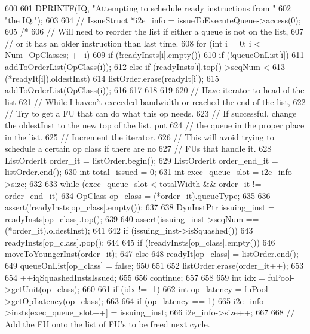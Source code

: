 \begin{DoxyCode}
600 {
601     DPRINTF(IQ, "Attempting to schedule ready instructions from "
602             "the IQ.\n");
603 
604 //    IssueStruct *i2e_info = issueToExecuteQueue->access(0);
605 /*
606     // Will need to reorder the list if either a queue is not on the list,
607     // or it has an older instruction than last time.
608     for (int i = 0; i < Num_OpClasses; ++i) {
609         if (!readyInsts[i].empty()) {
610             if (!queueOnList[i]) {
611                 addToOrderList(OpClass(i));
612             } else if (readyInsts[i].top()->seqNum  <
613                        (*readyIt[i]).oldestInst) {
614                 listOrder.erase(readyIt[i]);
615                 addToOrderList(OpClass(i));
616             }
617         }
618     }
619 
620     // Have iterator to head of the list
621     // While I haven't exceeded bandwidth or reached the end of the list,
622     // Try to get a FU that can do what this op needs.
623     // If successful, change the oldestInst to the new top of the list, put
624     // the queue in the proper place in the list.
625     // Increment the iterator.
626     // This will avoid trying to schedule a certain op class if there are no
627     // FUs that handle it.
628     ListOrderIt order_it = listOrder.begin();
629     ListOrderIt order_end_it = listOrder.end();
630     int total_issued = 0;
631     int exec_queue_slot = i2e_info->size;
632 
633     while (exec_queue_slot < totalWidth && order_it != order_end_it) {
634         OpClass op_class = (*order_it).queueType;
635 
636         assert(!readyInsts[op_class].empty());
637 
638         DynInstPtr issuing_inst = readyInsts[op_class].top();
639 
640         assert(issuing_inst->seqNum == (*order_it).oldestInst);
641 
642         if (issuing_inst->isSquashed()) {
643             readyInsts[op_class].pop();
644 
645             if (!readyInsts[op_class].empty()) {
646                 moveToYoungerInst(order_it);
647             } else {
648                 readyIt[op_class] = listOrder.end();
649                 queueOnList[op_class] = false;
650             }
651 
652             listOrder.erase(order_it++);
653 
654             ++iqSquashedInstsIssued;
655 
656             continue;
657         }
658 
659         int idx = fuPool->getUnit(op_class);
660 
661         if (idx != -1) {
662             int op_latency = fuPool->getOpLatency(op_class);
663 
664             if (op_latency == 1) {
665                 i2e_info->insts[exec_queue_slot++] = issuing_inst;
666                 i2e_info->size++;
667 
668                 // Add the FU onto the list of FU's to be freed next cycle.
}}}}
\end{DoxyCode}

